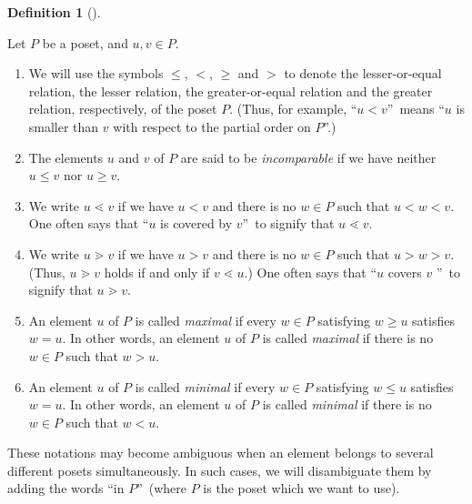 \documentclass[numbers=enddot,12pt,final,onecolumn,notitlepage]{scrartcl}%
\theoremstyle{definition}
\newtheorem{defi}[theo]{Definition}
\newenvironment{definition}[1][]
{\begin{defi}[#1]\begin{leftbar}}
{\end{leftbar}\end{defi}}
\begin{document}
\begin{definition}
Let $P$ be a poset, and $u,v\in P$.

\begin{enumerate}
\item[\textbf{(a)}] We will use the symbols $\leq$, $<$, $\geq$ and $>$ to
denote the lesser-or-equal relation, the lesser relation, the greater-or-equal
relation and the greater relation, respectively, of the poset $P$. (Thus, for
example, \textquotedblleft$u<v$\textquotedblright\ means \textquotedblleft$u$
is smaller than $v$ with respect to the partial order on $P$\textquotedblright.)

\item[\textbf{(b)}] The elements $u$ and $v$ of $P$ are said to be
\emph{incomparable} if we have neither $u\leq v$ nor $u\geq v$.

\item[\textbf{(c)}] We write $u\lessdot v$ if we have $u<v$ and there is no
$w\in P$ such that $u<w<v$. One often says that \textquotedblleft$u$ is
covered by $v$\textquotedblright\ to signify that $u\lessdot v$.

\item[\textbf{(d)}] We write $u\gtrdot v$ if we have $u>v$ and there is no
$w\in P$ such that $u>w>v$. (Thus, $u\gtrdot v$ holds if and only if
$v\lessdot u$.) One often says that \textquotedblleft$u$ covers $v$%
\textquotedblright\ to signify that $u\gtrdot v$.

\item[\textbf{(e)}] An element $u$ of $P$ is called \emph{maximal} if every
$w\in P$ satisfying $w\geq u$ satisfies $w=u$. In other words, an element $u$
of $P$ is called \emph{maximal} if there is no $w\in P$ such that $w>u$.

\item[\textbf{(f)}] An element $u$ of $P$ is called \emph{minimal} if every
$w\in P$ satisfying $w\leq u$ satisfies $w=u$. In other words, an element $u$
of $P$ is called \emph{minimal} if there is no $w\in P$ such that $w<u$.
\end{enumerate}

These notations may become ambiguous when an element belongs to several
different posets simultaneously. In such cases, we will disambiguate them by
adding the words \textquotedblleft in $P$\textquotedblright\ (where $P$ is the
poset which we want to use).\footnotemark
\end{definition}

\end{document}
